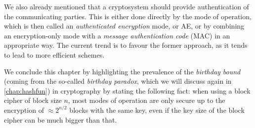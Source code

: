 We also already mentioned that a cryptosystem should provide authentication of the communicating parties. This is either done directly by the mode of operation,
which is then
called an \emph{authenticated encryption} mode, or AE, or by combining an encryption-only mode with a \emph{message authentication code} (MAC) in an appropriate way. The current
trend is to favour the former approach, as it tends to lead to more efficient schemes.

We conclude this chapter by highlighting the prevalence of the \emph{birthday bound} (coming from the so-called \emph{birthday paradox}, which we will
discuss again in \autoref{chap:hashfun}) in cryptography by stating the following fact: when using a block cipher of block size $n$, most modes of operation are only
secure up to the encryption of $\approx 2^{n/2}$ blocks with the same key, even if the key size of the block cipher can be much bigger than that.


